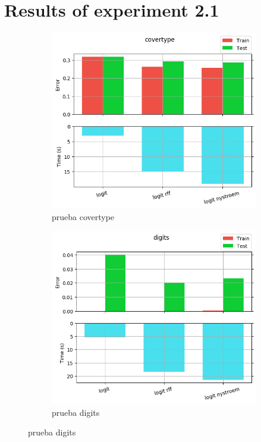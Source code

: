
\chapter{Results of experiment 2.1} %

\label{Appendix2-1} %


\begin{figure}[ht]
  \centering
  \begin{subfigure}[b]{0.5\linewidth}
    \centering\captionsetup{width=.8\linewidth}\includegraphics[width=\imgscale\linewidth]{Figures/2_1/covertype}
    \caption{prueba covertype}
    \label{fig:2_1_covertype}
  \end{subfigure}%
  \begin{subfigure}[b]{0.5\linewidth}
    \centering\captionsetup{width=.8\linewidth}\includegraphics[width=\imgscale\linewidth]{Figures/2_1/digits}
    \caption{prueba digits}
    \label{fig:2_1_digits}
  \end{subfigure}
\end{figure}


